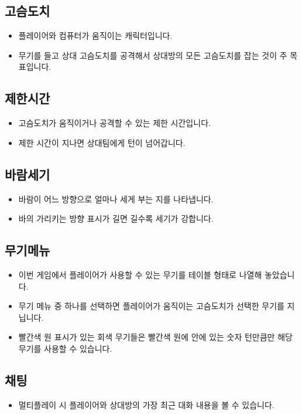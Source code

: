 \documentclass{report}
\begin{document}
\begin{flushleft}
    \subsection{고슴도치}
    \begin{itemize}
        \item 플레이어와 컴퓨터가 움직이는 캐릭터입니다. 
        \item 무기를 들고 상대 고슴도치를 공격해서 상대방의 모든 고슴도치를 잡는 것이 주 목표입니다.
    \end{itemize}
    \subsection{제한시간}
        \begin{itemize}
        \item 고슴도치가 움직이거나 공격할 수 있는 제한 시간입니다. 
        \item 제한 시간이 지나면 상대팀에게 턴이 넘어갑니다.
    \end{itemize}
    \subsection{바람세기}
    \begin{itemize}
        \item 바람이 어느 방향으로 얼마나 세게 부는 지를 나타냅니다.
        \item 바의 가리키는 방향 표시가 길면 길수록 세기가 강합니다.
    \end{itemize}
    \subsection{무기메뉴}
    \begin{itemize}
        \item 이번 게임에서 플레이어가 사용할 수 있는 무기를 테이블 형태로 나열해 놓았습니다. 
        \item 무기 메뉴 중 하나를 선택하면 플레이어가 움직이는 고슴도치가 선택한 무기를 지닙니다.
        \item 빨간색 원 표시가 있는 회색 무기들은 빨간색 원에 안에 있는 숫자 턴만큼만 해당 무기를 사용할 수 있습니다. 
    \end{itemize}
    \subsection{채팅}
    \begin{itemize}
        \item 멀티플레이 시 플레이어와 상대방의 가장 최근 대화 내용을 볼 수 있습니다. 
    \end{itemize}

\end{flushleft}
\end{document}
